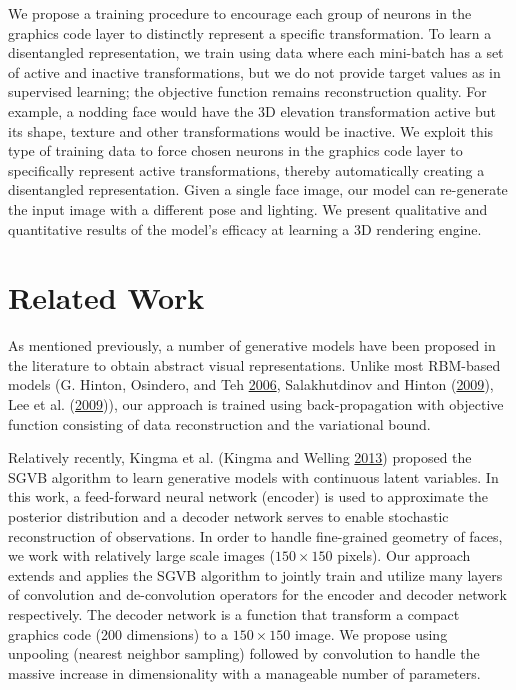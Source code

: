 \documentclass[12pt,twoside]{mitthesis}
\begin{document}
We propose a training procedure to encourage each group of neurons in
the graphics code layer to distinctly represent a specific
transformation. To learn a disentangled representation, we train using
data where each mini-batch has a set of active and inactive
transformations, but we do not provide target values as in supervised
learning; the objective function remains reconstruction quality. For
example, a nodding face would have the 3D elevation transformation
active but its shape, texture and other transformations would be
inactive. We exploit this type of training data to force chosen neurons
in the graphics code layer to specifically represent active
transformations, thereby automatically creating a disentangled
representation. Given a single face image, our model can re-generate the
input image with a different pose and lighting. We present qualitative
and quantitative results of the model's efficacy at learning a 3D
rendering engine.

\section{Related Work}\label{related-work}

As mentioned previously, a number of generative models have been
proposed in the literature to obtain abstract visual representations.
Unlike most RBM-based models (G. Hinton, Osindero, and Teh
\protect\hyperlink{ref-hinton2006fast}{2006}, Salakhutdinov and Hinton
(\protect\hyperlink{ref-salakhutdinov2009deep}{2009}), Lee et al.
(\protect\hyperlink{ref-lee2009convolutional}{2009})), our approach is
trained using back-propagation with objective function consisting of
data reconstruction and the variational bound.

Relatively recently, Kingma et al. (Kingma and Welling
\protect\hyperlink{ref-kingma2013auto}{2013}) proposed the SGVB
algorithm to learn generative models with continuous latent variables.
In this work, a feed-forward neural network (encoder) is used to
approximate the posterior distribution and a decoder network serves to
enable stochastic reconstruction of observations. In order to handle
fine-grained geometry of faces, we work with relatively large scale
images (\(150 \times 150\) pixels). Our approach extends and applies the
SGVB algorithm to jointly train and utilize many layers of convolution
and de-convolution operators for the encoder and decoder network
respectively. The decoder network is a function that transform a compact
graphics code (200 dimensions) to a \(150 \times 150\) image. We propose
using unpooling (nearest neighbor sampling) followed by convolution to
handle the massive increase in dimensionality with a manageable number
of parameters.
\end{document}
